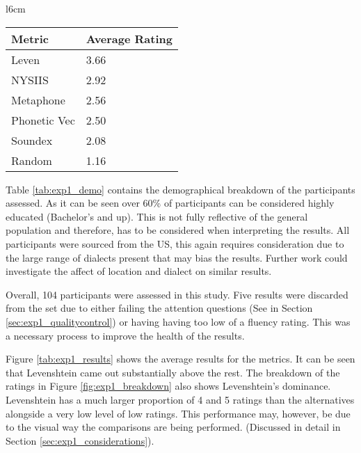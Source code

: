 \begin{wrapfigure}[10]{l}{6cm}
    \centering
    \begin{tabular}{|l|l|}
        \hline
        Metric & Average Rating \\
        \hline
        Leven     & 3.66 \\
        NYSIIS    & 2.92 \\
        Metaphone & 2.56 \\
        Phonetic Vec & 2.50 \\
        Soundex & 2.08 \\
        \hline
        Random  & 1.16 \\
        \hline
    \end{tabular}
    \caption{Average metric performance}
    \label{tab:exp1_results}
\end{wrapfigure}

Table \ref{tab:exp1_demo} contains the demographical breakdown of the participants assessed. As it can be seen over 60\% of participants can be considered highly educated (Bachelor’s and up). This is not fully reflective of the general population and therefore, has to be considered when interpreting the results. All participants were sourced from the US, this again requires consideration due to the large range of dialects present that may bias the results. Further work could investigate the affect of location and dialect on similar results. 

Overall, 104 participants were assessed in this study. Five results were discarded from the set due to either failing the attention questions (See in Section \ref{sec:exp1_qualitycontrol}) or having having too low of a fluency rating. This was a necessary process to improve the health of the results. 

Figure \ref{tab:exp1_results} shows the average results for the metrics. It can be seen that Levenshtein came out substantially above the rest. The breakdown of the ratings in Figure \ref{fig:exp1_breakdown} also shows Levenshtein's dominance. Levenshtein has a much larger proportion of 4 and 5 ratings than the alternatives alongside a very low level of low ratings. This performance may, however, be due to the visual way the comparisons are being performed. (Discussed in detail in Section \ref{sec:exp1_considerations}). 


